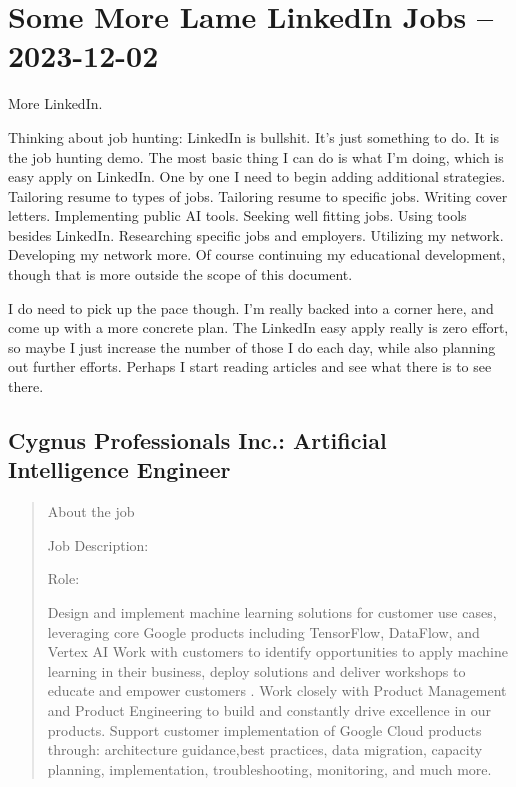\documentclass[
	letterpaper, %
	12pt, %
]{CSSullivanBusinessReport}
\begin{document}
\section[2 Dec: LinkedIn]{Some More Lame LinkedIn Jobs -- 2023-12-02} %

More LinkedIn. 

Thinking about job hunting: LinkedIn is bullshit. It's just something to do. It is the job hunting demo. The most basic thing I can do is what I'm doing, which is easy apply on LinkedIn. One by one I need to begin adding additional strategies. Tailoring resume to types of jobs. Tailoring resume to specific jobs. Writing cover letters. Implementing public AI tools. Seeking well fitting jobs. Using tools besides LinkedIn. Researching specific jobs and employers. Utilizing my network. Developing my network more. Of course continuing my educational development, though that is more outside the scope of this document. 

I do need to pick up the pace though. I'm really backed into a corner here, and come up with a more concrete plan. The LinkedIn easy apply really is zero effort, so maybe I just increase the number of those I do each day, while also planning out further efforts. Perhaps I start reading articles and see what there is to see there. 

\subsection[Cygnus Professionals Inc.]{Cygnus Professionals Inc.: Artificial Intelligence Engineer}

\begin{quote}
	About the job

	Job Description:
	
	Role:
	
	Design and implement machine learning solutions for customer use cases, leveraging core Google products including TensorFlow, DataFlow, and Vertex AI
	Work with customers to identify opportunities to apply machine learning in their business, deploy solutions and deliver workshops to educate and empower customers .
	Work closely with Product Management and Product Engineering to build and constantly drive excellence in our products.
	Support customer implementation of Google Cloud products through: architecture guidance,best practices, data migration, capacity planning, implementation, troubleshooting, monitoring, and much more. 
\end{quote}
\end{document}
